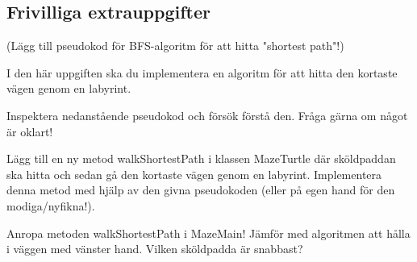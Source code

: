 \subsection{Frivilliga extrauppgifter}

(Lägg till pseudokod för BFS-algoritm för att hitta "shortest path"!)

\Task I den här uppgiften ska du implementera en algoritm för att hitta den kortaste vägen genom en labyrint.

\Subtask Inspektera nedanstående pseudokod och försök förstå den. Fråga gärna om något är oklart!

\Subtask Lägg till en ny metod walkShortestPath i klassen MazeTurtle där sköldpaddan ska hitta och sedan gå den kortaste vägen genom en labyrint. Implementera denna metod med hjälp av den givna pseudokoden (eller på egen hand för den modiga/nyfikna!).

\Subtask Anropa metoden walkShortestPath i MazeMain! Jämför med algoritmen att hålla i väggen med vänster hand. Vilken sköldpadda är snabbast?
    
